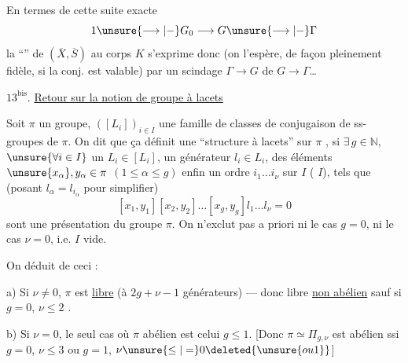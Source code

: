

En termes de cette suite exacte
\[
1\unsure{\longrightarrow|-}G_0\longrightarrow G\unsure{\longrightarrow|-}\Gamma
\]
la ``'' de $(\overline X,\overline S)$ au corps $K$ s'exprime
donc (on l'espère, de façon pleinement fidèle,
si la conj.  est valable) par
un scindage $\Gamma\to G$ de $G\to\Gamma$\dots

$13^{\mathrm{bis}}$. \uline{Retour sur la notion de groupe à lacets}

Soit $\pi$ un groupe, $([L_i])_{i\in I}$ une famille
de classes de conjugaison de ss-groupes de
$\pi$. On dit que ça définit une 
``structure à lacets'' sur $\pi$ \inserted{[de type $(g,\nu)$]}, si $\exists\,g\in\mathbb N$,
$\unsure{\forall i\in I}$ un $L_i\in[L_i]$, un générateur
$l_i\in L_i$, des éléments $\unsure{x_\alpha},y_\alpha\in\pi$ $(1\le\alpha\le g)$
enfin un ordre $i_1\dots i_\nu$ sur $I$ ( \inserted{$\nu=$}  $I$),
tels que (posant $l_\alpha=l_{i_\alpha}$ pour simplifier)
\[
[x_1,y_1][x_2,y_2]\dots[x_g,y_g]l_1\dots l_\nu=0
\]
sont une présentation du groupe $\pi$. On
n'exclut pas a priori ni le cas $g=0$, ni le cas $\nu=0$,
i.e. $I$ vide.

On déduit de ceci :

a) Si $\nu\ne0$, $\pi$ est \uline{libre} (à $2g+\nu-1$ générateurs) ---
donc libre \uline{non abélien} sauf si $g=0$, $\nu\le2$ .



b) Si $\nu=0$, le seul cas où $\pi$ abélien est celui
$g\le1$. [Donc $\pi\simeq\Pi_{g,\nu}$ est abélien ssi
$g=0$, $\nu\le3$ ou $g=1$, $\nu\unsure{\le|=}0\deleted{\unsure{ou 1}}$]

